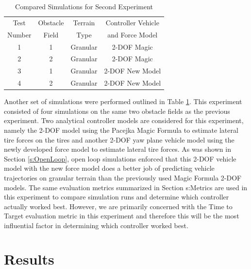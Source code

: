 \documentclass[12pt,onecolumn]{report}
\begin{document}
\begin{table}
\begin{center}
	\begin{tabular}{||c |c | c | c||} 
		\hline
		Test  & Obstacle & Terrain  & Controller Vehicle \\
		Number &  Field & Type & and Force Model\\ [0.5ex] 	
		\hline\hline
		1 & 1 & Granular & 2-DOF Magic\\ 
		\hline
		2 & 2 & Granular & 2-DOF Magic\\
		\hline
		3 & 1 & Granular & 2-DOF New Model\\
		\hline
		4 & 2 & Granular & 2-DOF New Model\\
		\hline
	\end{tabular}
\end{center}
\caption{Compared Simulations for Second Experiment}
\label{t:TestMatrix2}
\end{table}

Another set of simulations were performed outlined in Table \ref{t:TestMatrix2}. This experiment consisted of four simulations on the same two obstacle fields as the previous experiment. Two analytical controller models are considered for this experiment, namely the 2-DOF model using the Pacejka Magic Formula to estimate lateral tire forces on the tires and another 2-DOF yaw plane vehicle model using the newly developed force model to estimate lateral tire forces. As was shown in Section \ref{s:OpenLoop}, open loop simulations enforced that this 2-DOF vehicle model with the new force model does a better job of predicting vehicle trajectories on granular terrain than the previously used Magic Formula 2-DOF models. The same evaluation metrics summarized in Section {s:Metrics} are used in this experiment to compare simulation runs and determine which controller actually worked best. However, we are primarily concerned with the Time to Target evaluation metric in this experiment and therefore this will be the most influential factor in determining which controller worked best. 

\section{Results}\label{s:Results2}
\end{document}
